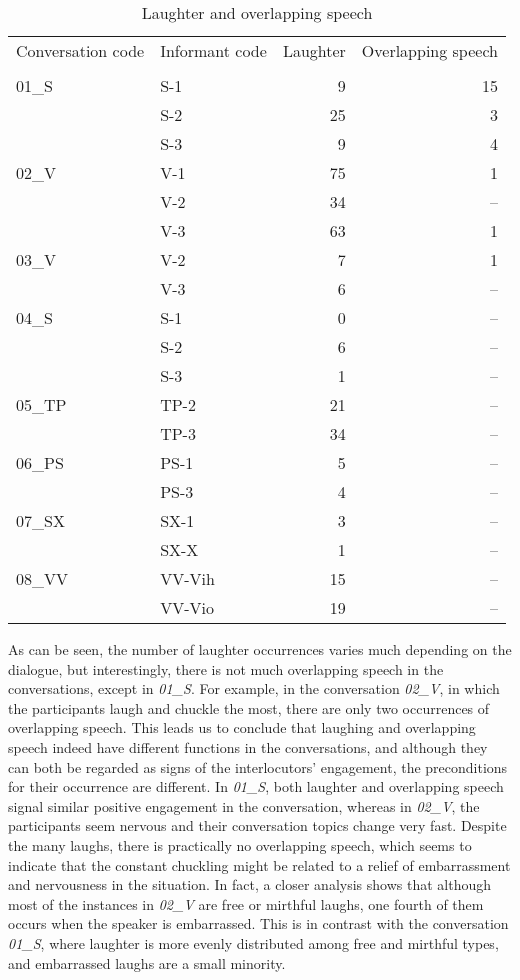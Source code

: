 \documentclass[runningheads,a4paper]{llncs}
\begin{document}
\begin{table}\center
\caption{Laughter and overlapping speech}
\label{tab:laughter}
\begin{tabular}{| l | l | r | r |}
\hline
Conversation code & Informant code & Laughter & Overlapping speech    \\
  		     	  &                &          & \\
\hline
01\_S & S-1     &  9 & 15 \\
      & S-2     & 25 &  3 \\
      & S-3     &  9 &  4 \\ \hline
02\_V & V-1     & 75 &  1 \\
      & V-2     & 34 & -- \\
      & V-3     & 63 &  1 \\ \hline
03\_V & V-2     &  7 &  1 \\
      & V-3     &  6 & -- \\ \hline
04\_S & S-1     &  0 & -- \\
      & S-2     &  6 & -- \\
      & S-3     &  1 & -- \\ \hline
05\_TP & TP-2   & 21 & -- \\
       & TP-3   & 34 & -- \\ \hline
06\_PS & PS-1   &  5 & -- \\
       & PS-3   &  4 & -- \\ \hline
07\_SX & SX-1   &  3 & -- \\
       & SX-X   &  1 & -- \\ \hline
08\_VV & VV-Vih & 15 & -- \\
       & VV-Vio & 19 & -- \\ \hline
\end{tabular}
\end{table}

As can be seen, the number of laughter occurrences varies much depending on the dialogue, but interestingly, there is not much overlapping speech in the conversations, except
in \textit{01\_S}. For example, in the conversation \textit{02\_V}, in which the participants laugh and chuckle the most, there are only two occurrences of overlapping speech. This leads us to conclude that laughing and overlapping speech indeed have different functions in the conversations, and although they can both be regarded as signs of the interlocutors' engagement, the preconditions for their occurrence are different. In \textit{01\_S}, both laughter and overlapping speech signal similar positive engagement in the conversation, whereas in \textit{02\_V}, the participants seem nervous and their conversation topics change very fast. Despite the many laughs, there is practically no overlapping speech, which seems to indicate that the constant chuckling might be related to a relief of embarrassment and nervousness in the situation.
In fact, a closer analysis shows that although most of the instances in \textit{02\_V} are free or mirthful laughs, one fourth of them occurs when the speaker is embarrassed. This is in contrast with the conversation
\textit{01\_S}, where laughter is more evenly distributed among free and mirthful types, and embarrassed laughs are a small minority.
\end{document}
